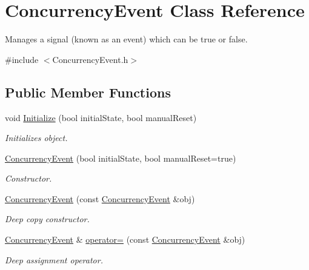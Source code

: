 \hypertarget{class_concurrency_event}{
\section{ConcurrencyEvent Class Reference}
\label{class_concurrency_event}
}


Manages a signal (known as an event) which can be true or false.  




{\ttfamily \#include $<$ConcurrencyEvent.h$>$}

\subsection*{Public Member Functions}
\begin{DoxyCompactItemize}
\item 
void \hyperlink{class_concurrency_event_ae829784be604aae0a3152004073f1937}{Initialize} (bool initialState, bool manualReset)
\begin{DoxyCompactList}\small\item\em Initializes object. \item\end{DoxyCompactList}\item 
\hyperlink{class_concurrency_event_a647918654f36bb8c9655b94f7cba7280}{ConcurrencyEvent} (bool initialState, bool manualReset=true)
\begin{DoxyCompactList}\small\item\em Constructor. \item\end{DoxyCompactList}\item 
\hyperlink{class_concurrency_event_a47ecd3603f3d564b5fd82423d308627f}{ConcurrencyEvent} (const \hyperlink{class_concurrency_event}{ConcurrencyEvent} \&obj)
\begin{DoxyCompactList}\small\item\em Deep copy constructor. \item\end{DoxyCompactList}\item 
\hyperlink{class_concurrency_event}{ConcurrencyEvent} \& \hyperlink{class_concurrency_event_aa29ab3ed807b8d437269e6fa06095028}{operator=} (const \hyperlink{class_concurrency_event}{ConcurrencyEvent} \&obj)
\begin{DoxyCompactList}\small\item\em Deep assignment operator. \item\end{DoxyCompactList}\item 

\end{DoxyCompactItemize}
